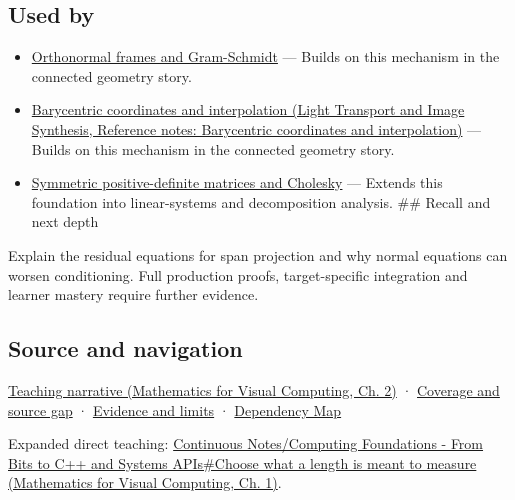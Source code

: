 \subsection{Used by}\label{appendix-3b863809f82a-used-by}

\hypertarget{appendix-3b863809f82a-used-by}{}

\begin{itemize}
\tightlist
\item
  \hyperref[appendix-c39f1ed34271]{Orthonormal frames and Gram-Schmidt} --- Builds on this mechanism in the connected geometry story.
\item
  \href{../04-Light-Transport-and-Image-Synthesis/main.pdf\#nameddest=appendix-02b9d9a81dca}{Barycentric coordinates and interpolation (Light Transport and Image Synthesis, Reference notes: Barycentric coordinates and interpolation)} --- Builds on this mechanism in the connected geometry story.
\item
  \hyperref[appendix-50d2ea3c9b26]{Symmetric positive-definite matrices and Cholesky} --- Extends this foundation into linear-systems and decomposition analysis. \#\# Recall and next depth
\end{itemize}

Explain the residual equations for span projection and why normal equations can worsen conditioning. Full production proofs, target-specific integration and learner mastery require further evidence.

\subsection{Source and navigation}\label{appendix-3b863809f82a-source-and-navigation}

\hypertarget{appendix-3b863809f82a-source-and-navigation}{}

\href{../02-Mathematics-for-Visual-Computing/main.pdf\#nameddest=01-foundations-i-ch018-a-gram-matrix-remembers-the-geometry-of-a-slanted-basis}{Teaching narrative (Mathematics for Visual Computing, Ch. 2)} · \hyperref[appendix-fd090d982a15-phase-6---parts-501-600]{Coverage and source gap} · \hyperref[appendix-a103e7846d21-phase-6---source-analysis-and-verification]{Evidence and limits} · \hyperref[appendix-4ad47bdd269a]{Dependency Map}

Expanded direct teaching: \href{../02-Mathematics-for-Visual-Computing/main.pdf\#nameddest=01-foundations-i-ch017-choose-what-a-length-is-meant-to-measure}{Continuous Notes/Computing Foundations - From Bits to C++ and Systems APIs\#Choose what a length is meant to measure (Mathematics for Visual Computing, Ch. 1)}.
